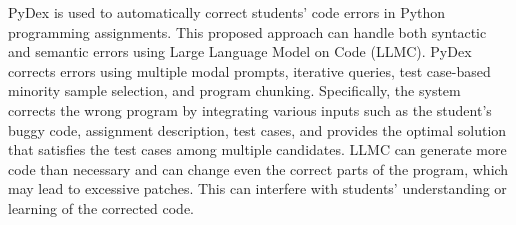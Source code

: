 \documentclass[10pt,conference]{IEEEtran}
\begin{document}
        PyDex\cite{zhang2024pydex} is used to automatically correct students' code errors in Python programming assignments. This proposed approach can handle both syntactic and semantic errors using Large Language Model on Code (LLMC). PyDex corrects errors using multiple modal prompts, iterative queries, test case-based minority sample selection, and program chunking. Specifically, the system corrects the wrong program by integrating various inputs such as the student's buggy code, assignment description, test cases, and provides the optimal solution that satisfies the test cases among multiple candidates. LLMC can generate more code than necessary and can change even the correct parts of the program, which may lead to excessive patches. This can interfere with students' understanding or learning of the corrected code.
    
    
        
\end{document}
